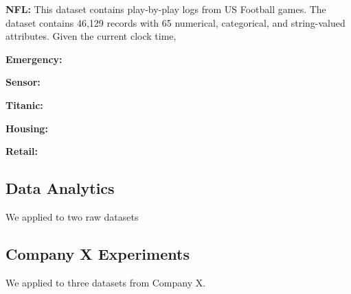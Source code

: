 \vspace{0.5em}\noindent\textbf{NFL: } This dataset contains play-by-play logs from US Football games. The dataset contains 46,129 records with 65 numerical, categorical, and string-valued attributes. Given the current clock time, 

\vspace{0.5em}\noindent\textbf{Emergency: }

\vspace{0.5em}\noindent\textbf{Sensor: }

\vspace{0.5em}\noindent\textbf{Titanic: }

\vspace{0.5em}\noindent\textbf{Housing: }

\vspace{0.5em}\noindent\textbf{Retail: }


\subsection{Data Analytics}
We applied \sys to two raw datasets


\subsection{Company X Experiments}
We applied \sys to three datasets from Company X.



